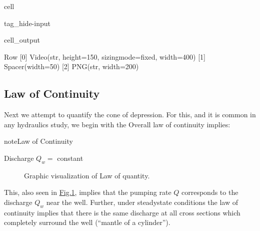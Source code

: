 \documentclass[letterpaper,10pt,english]{jupyterBook}
\begin{document}
\begin{sphinxuseclass}{cell}
\begin{sphinxuseclass}{tag_hide-input}\begin{sphinxVerbatimOutput}

\begin{sphinxuseclass}{cell_output}
\begin{sphinxVerbatim}[commandchars=\\\{\}]
Row
    [0] Video(str, height=150, sizing\PYGZus{}mode=\PYGZsq{}fixed\PYGZsq{}, width=400)
    [1] Spacer(width=50)
    [2] PNG(str, width=200)
\end{sphinxVerbatim}

\end{sphinxuseclass}\end{sphinxVerbatimOutput}

\end{sphinxuseclass}
\end{sphinxuseclass}

\subsection{Law of Continuity}
\label{\detokenize{content/flow/L8/18_wells:law-of-continuity}}
\sphinxAtStartPar
Next we attempt to quantify the cone of depression. For this, and it is common in any hydraulics study, we begin with the  Overall law of continuity implies:

\begin{sphinxadmonition}{note}{Law of Continuity}

\sphinxAtStartPar
Discharge \(Q_w = \) constant
\end{sphinxadmonition}

\begin{figure}[htbp]
\centering
\capstart

\noindent{}
\caption{Graphic visualization of Law of quantity.}\label{\detokenize{content/flow/L8/18_wells:law-cont}}\end{figure}

\sphinxAtStartPar
This, also seen in \hyperref[\detokenize{content/flow/L8/18_wells:law-cont}]{Fig.\@ \ref{\detokenize{content/flow/L8/18_wells:law-cont}}}, implies that the pumping rate \(Q\) corresponds to the discharge \(Q_w\) near the well. Further, under steady\sphinxhyphen{}state conditions the law of continuity
implies that there is the same discharge at all cross sections which
completely surround the well (“mantle of a cylinder”).
\end{document}
